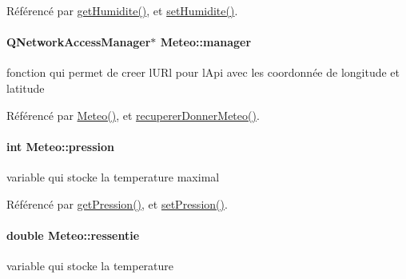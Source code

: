 Référencé par \hyperlink{class_meteo_a336cfea55c062ebe45fbc7d1a48aaaa1}{get\+Humidite()}, et \hyperlink{class_meteo_adb383986b49742d49f3fe86ca7bec358}{set\+Humidite()}.

\paragraph[{\texorpdfstring{manager}{manager}}]{\setlength{\rightskip}{0pt plus 5cm}Q\+Network\+Access\+Manager$\ast$ Meteo\+::manager\hspace{0.3cm}{\ttfamily [private]}}\hypertarget{class_meteo_a020089a0880ff5d97df50e6a97b68f90}{}\label{class_meteo_a020089a0880ff5d97df50e6a97b68f90}
fonction qui permet de creer l\textquotesingle{}U\+Rl pour l\textquotesingle{}Api avec les coordonnée de longitude et latitude 

Référencé par \hyperlink{class_meteo_aa7dab03da06a05dce302c154ad9aec53}{Meteo()}, et \hyperlink{class_meteo_abb613fded967168801097cf487ac2e29}{recuperer\+Donner\+Meteo()}.

\paragraph[{\texorpdfstring{pression}{pression}}]{\setlength{\rightskip}{0pt plus 5cm}int Meteo\+::pression\hspace{0.3cm}{\ttfamily [private]}}\hypertarget{class_meteo_a28fe6c4ed03fcf9829dd5a8997bfb0fc}{}\label{class_meteo_a28fe6c4ed03fcf9829dd5a8997bfb0fc}
variable qui stocke la temperature maximal 

Référencé par \hyperlink{class_meteo_a2a4cd85d63157f6b682d37f9c19d1683}{get\+Pression()}, et \hyperlink{class_meteo_a919f06b3944298a47daf3405bde46402}{set\+Pression()}.

\paragraph[{\texorpdfstring{ressentie}{ressentie}}]{\setlength{\rightskip}{0pt plus 5cm}double Meteo\+::ressentie\hspace{0.3cm}{\ttfamily [private]}}\hypertarget{class_meteo_a405ea827846e04994ed8073f82978995}{}\label{class_meteo_a405ea827846e04994ed8073f82978995}
variable qui stocke la temperature 


